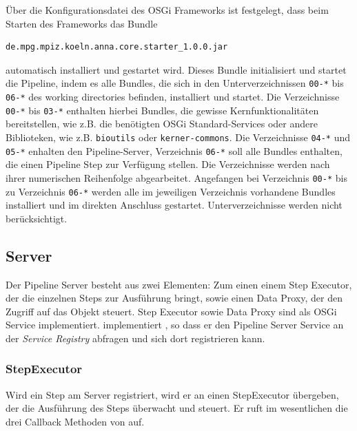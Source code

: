 Über die Konfigurationsdatei des OSGi Frameworks ist festgelegt, dass beim
Starten des Frameworks das Bundle
\begin{verbatim}de.mpg.mpiz.koeln.anna.core.starter_1.0.0.jar\end{verbatim}
automatisch installiert und gestartet wird. Dieses Bundle initialisiert und
startet die Pipeline, indem es alle Bundles, die sich in den Unterverzeichnissen
\texttt{00-*} bis \texttt{06-*} des working directories befinden, installiert
und startet. Die Verzeichnisse \texttt{00-*} bis \texttt{03-*} enthalten
hierbei Bundles, die gewisse Kernfunktionalitäten bereitstellen, wie z.B. die
benötigten OSGi Standard-Services oder andere Biblioteken, wie z.B.
\texttt{bioutils} oder \texttt{kerner-commons}.
Die Verzeichnisse \texttt{04-*} und \texttt{05-*} enhalten den
Pipeline-Server, Verzeichnis \texttt{06-*} soll alle Bundles enthalten, die
einen Pipeline Step zur Verfügung stellen.
Die Verzeichnisse werden nach ihrer numerischen Reihenfolge abgearbeitet.
Angefangen bei Verzeichnis \texttt{00-*} bis zu Verzeichnis \texttt{06-*} werden
alle im jeweiligen Verzeichnis vorhandene Bundles installiert und im direkten
Anschluss gestartet. Unterverzeichnisse werden nicht berücksichtigt.

\subsection{Server}
Der Pipeline Server besteht aus zwei Elementen: Zum einen einem 
Step Executor, der die einzelnen Steps zur Ausführung bringt, sowie einen
Data Proxy, der den Zugriff auf das  Objekt steuert.
Step Executor sowie Data Proxy sind als OSGi Service implementiert.
 implementiert , so dass er den
Pipeline Server Service an der \textit{Service Registry} abfragen und sich dort
registrieren kann.
%

\subsubsection{StepExecutor}
Wird ein Step am Server registriert, wird er an einen StepExecutor übergeben,
der die Ausführung des Steps überwacht und steuert. Er ruft im wesentlichen
die drei Callback Methoden von  auf.


